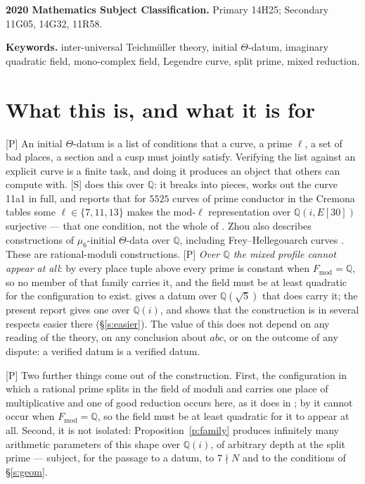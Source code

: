 \documentclass[11pt]{article}
\theoremstyle{plain}
\theoremstyle{definition}
\newcommand{\Fmod}{F_{\mathrm{mod}}}
\begin{document}
\medskip
\noindent\textbf{2020 Mathematics Subject Classification.}
Primary 14H25; Secondary 11G05, 14G32, 11R58.

\noindent\textbf{Keywords.}
inter-universal Teichm\"uller theory, initial $\Theta$-datum, imaginary quadratic
field, mono-complex field, Legendre curve, split prime, mixed reduction.

\section{What this is, and what it is for}\label{s:why}

\textup{[P]} An initial $\Theta$-datum is a list of conditions
\cite[Def.~3.1]{IUT1} that a curve, a prime $\ell$, a set of bad places, a section
and a cusp must jointly satisfy.  Verifying the list against an explicit curve is a
finite task, and doing it produces an object that others can compute with.
\textup{[S]} \cite[\S2.10]{DH25} does this over $\mathbb{Q}$: it breaks
\cite[Def.~3.1]{IUT1} into pieces, works out the curve 11a1 in full, and reports that
for $5525$ curves of prime conductor in the Cremona tables some
$\ell\in\{7,11,13\}$ makes the mod-$\ell$ representation over $\mathbb{Q}(i,E[30])$
surjective \cite[\S2.11, p.~16]{DH25} --- that one condition, not the whole
of \cite[Def.~3.1]{IUT1}.
Zhou also describes constructions of $\mu_6$-initial $\Theta$-data over
$\mathbb Q$, including Frey--Hellegouarch curves
\cite[Prop.~2.5, Lemma~2.6]{Zhou}.
These are rational-moduli constructions.
\textup{[P]} \emph{Over $\mathbb{Q}$ the mixed
profile cannot appear at all}: by \cite[Cor.~3(i)]{First} every place tuple above every
prime is constant when $\Fmod=\mathbb{Q}$, so no member of that family carries it,
and the field must be at least quadratic for the configuration to exist.  \cite{First}
gives a datum over $\mathbb{Q}(\sqrt5)$ that does carry it; the present report gives
one over $\mathbb{Q}(i)$, and shows that the construction is in several respects
easier there (\S\ref{s:easier}).  The value of this does not
depend on any reading of the theory, on any conclusion about $abc$, or on the outcome
of any dispute: a verified datum is a verified datum.

\textup{[P]} Two further things come out of the construction.  First, the
configuration in which a rational prime splits in the field of moduli and carries one
place of multiplicative and one of good reduction occurs here, as it does in
\cite{First}; by \cite[Cor.~3(i)]{First} it cannot occur when
$\Fmod=\mathbb{Q}$, so the field must be at least quadratic for it to appear at all.
Second, it is not isolated: Proposition~\ref{p:family} produces infinitely many
arithmetic parameters of this shape over $\mathbb{Q}(i)$, of arbitrary depth at the
split prime --- subject, for the passage to a datum, to $7\nmid N$ and to the conditions
of \S\ref{s:geom}.
\end{document}
